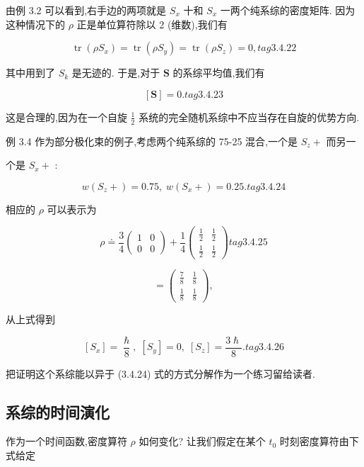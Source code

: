 由例 3.2 可以看到,右手边的两项就是 ${S}_{x}$ 十和 ${S}_{x}$ 一两个纯系综的密度矩阵. 因为这种情况下的 $\rho$ 正是单位算符除以 2 (维数),我们有

$$
\operatorname{tr}\left( {\rho {S}_{x}}\right) = \operatorname{tr}\left( {\rho {S}_{y}}\right) = \operatorname{tr}\left( {\rho {S}_{z}}\right) = 0, tag{3. 4.22}
$$

其中用到了 ${S}_{k}$ 是无迹的. 于是,对于 $\mathbf{S}$ 的系综平均值,我们有

$$
\left\lbrack \mathbf{S}\right\rbrack = 0. tag{3. 4.23}
$$

这是合理的,因为在一个自旋 $\frac{1}{2}$ 系统的完全随机系综中不应当存在自旋的优势方向.

例 3.4 作为部分极化束的例子,考虑两个纯系综的 75-25 混合,一个是 ${S}_{z} +$ 而另一

个是 ${S}_{x} +$ :

$$
w\left( {{S}_{z} + }\right) = {0.75},\;w\left( {{S}_{x} + }\right) = {0.25}. tag{3. 4.24}
$$

相应的 $\rho$ 可以表示为

$$
\rho \doteq \frac{3}{4}\left( \begin{array}{ll} 1 & 0 \\ 0 & 0 \end{array}\right) + \frac{1}{4}\left( \begin{array}{ll} \frac{1}{2} & \frac{1}{2} \\ \frac{1}{2} & \frac{1}{2} \end{array}\right) tag{3. 4.25}
$$

$$
= \left( \begin{array}{ll} \frac{7}{8} & \frac{1}{8} \\ \frac{1}{8} & \frac{1}{8} \end{array}\right) ,
$$

从上式得到

$$
\left\lbrack {S}_{x}\right\rbrack = \frac{\hslash }{8},\;\left\lbrack {S}_{y}\right\rbrack = 0,\;\left\lbrack {S}_{z}\right\rbrack = \frac{3\hslash }{8}. tag{3. 4.26}
$$

把证明这个系综能以异于 (3.4.24) 式的方式分解作为一个练习留给读者.

\subsection{系综的时间演化}

作为一个时间函数,密度算符 $\rho$ 如何变化? 让我们假定在某个 ${t}_{0}$ 时刻密度算符由下式给定

